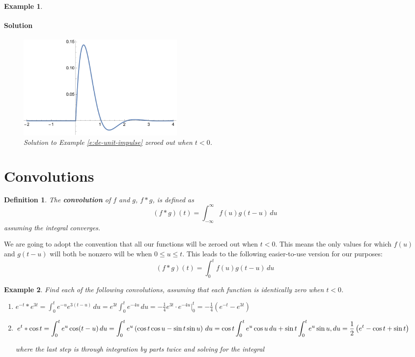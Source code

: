 \documentclass[letterpaper, 11pt, openany]{book}
\theoremstyle{mytheoremstyle}
\newtheorem{definition}{Definition}[section]
\theoremstyle{myexamplestyle}
\newtheorem{example}{Example}[section]
\newenvironment{solution}{\paragraph{\sffamily \smaller \fontseries{b}\selectfont Solution}}{\hfill\faSquare}
\begin{document}
\begin{example}
\begin{solution}
\begin{figure}[htbp]
            \centering
            \includegraphics[width=0.4\textwidth]{Figures/de-unit-impulse-response-zeroed.pdf}
            \caption{Solution to Example \ref{e:de-unit-impulse} zeroed out when \(t<0\).}
            \label{f:de-unit-impulse-zeroed}
        \end{figure}
    \end{solution}
\end{example}
\section{Convolutions}
\setcounter{figure}{0}
\begin{definition}\label{d:convolution}
    The \textbf{convolution} of \(f\) and \(g\), \(f*g\), is defined as
    \[(f*g)(t) = \int_{-\infty}^{\infty} f(u)g(t-u)\, du\]
    assuming the integral converges.
\end{definition}

We are going to adopt the convention that all our functions will be zeroed out when \(t < 0\). This means the only values for which \(f(u)\) and \(g(t-u)\) will both be nonzero will be when \(0 \leq u \leq t\). This leads to the following easier-to-use version for our purposes:
\begin{equation}\label{d:convolution-zeroed}
    (f*g)(t) = \int_{0}^{t} f(u)g(t-u)\, du
\end{equation}


\begin{example}
    Find each of the following convolutions, assuming that each function is identically zero when \(t < 0\).
    \begin{enumerate}
        \item \(\displaystyle e^{-t} * e^{3t} = \int_{0}^{t} e^{-u}e^{3(t-u)}\, du = e^{3t} \int_{0}^{t} e^{-4u}\, du = -\frac{1}{4}e^{3t}\cdot e^{-4u} \bigg|_{0}^{t} = -\frac{1}{4}\left(e^{-t} - e^{3t}\right)\)
        \item \(\displaystyle e^{t} * \cos t = \int_{0}^{t} e^{u}\cos (t-u)\, du = \int_{0}^{t} e^{u}\left(\cos t \cos u - \sin t \sin u\right)\, du \\ = \cos t \int_{0}^{t} e^{u} \cos u \, du + \sin t \int_{0}^{t} e^{u} \sin u 
        , du = \frac{1}{2}\left(e^{t} -\cos t + \sin t\right)\)
        
        where the last step is through integration by parts twice and solving for the integral \faMeh
    \end{enumerate} 
\end{example}
\end{document}
